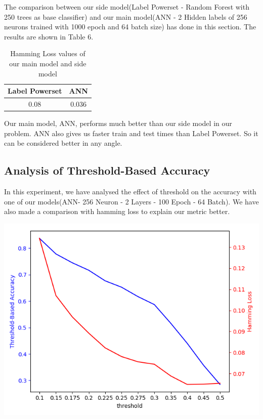 \documentclass[10pt,twocolumn,letterpaper]{article}
\begin{document}
The comparison between our side model(Label Powerset - Random Forest with 250 trees as base classifier) and our main model(ANN - 2 Hidden labels of 256 neurons trained with 1000 epoch and 64 batch size) has done in this section. The results are shown in Table 6.

\begin{table}[H]
\begin{center}
\begin{tabular}{|c|c|}
\hline
Label Powerset & ANN\\
\hline
0.08 & 0.036 \\
\hline
\end{tabular}
\end{center}
\caption{Hamming Loss values of our main model and side model}
\end{table}

Our main model, ANN, performs much better than our side model in our problem. ANN also gives us faster train and test times than Label Powerset. So it can be considered better in any angle.

\subsection{Analysis of Threshold-Based Accuracy}

In this experiment, we have analysed the effect of threshold on the accuracy with one of our models(ANN- 256 Neuron - 2 Layers - 100 Epoch - 64 Batch). We have also made a comparison with hamming loss to explain our metric better.

\includegraphics[width=1\linewidth]{hl-th}
\end{document}
